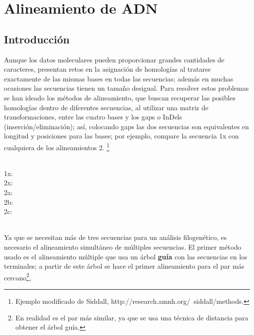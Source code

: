 \chapter{Alineamiento de ADN}
\section*{Introducci\'on}
\label{ch:alinear}
%
% 
% 
Aunque los datos moleculares pueden proporcionar grandes cantidades de caracteres, presentan retos 
en la asignaci\'on de homolog\'ias al tratarse exactamente de las mismas bases en todas las secuencias; adem\'as 
en muchas ocasiones las secuencias tienen un tama\~no desigual. 
Para resolver estos problemas se han ideado los m\'etodos de alineamiento, que buscan recuperar las posibles homolog\'ias 
dentro de diferentes secuencias, al utilizar una matriz de transformaciones, entre las cuatro bases y los gaps o 
InDels (inserci\'on/eliminaci\'on); as\'i, colocando gaps las dos secuencias son equivalentes en longitud y  posiciones
 para las bases; por ejemplo, compare la secuencia 1x con cualquiera de los alineamientos 2.
\footnote{Ejemplo modificado de Siddall, http://research.amnh.org/~siddall/methods.}\\
\\
\begin{small}
1x: \\
2x: \\
2a: \\
2b: \\
2c: \\
\end{small}
\\
Ya que se necesitan m\'as de tres secuencias para un an\'alisis filogen\'etico, es necesario el alineamiento simult\'aneo de 
m\'ultiples secuencias. El primer m\'etodo usado es el alineamiento m\'ultiple que usa un \'arbol \textbf{gu\'ia} con las 
secuencias en los terminales; a partir de este \'arbol se hace el primer alineamiento para el par m\'as 
cercano\footnote{En realidad es el par m\'as similar, ya que se usa una t\'ecnica de distancia para obtener el \'arbol gu\'ia.}, 
